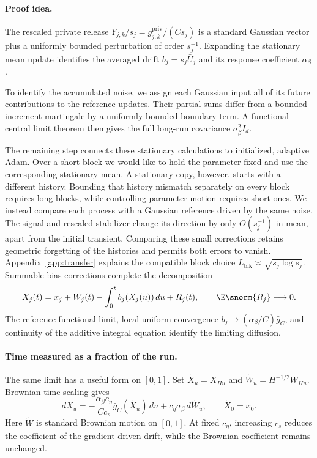 \paragraph{Proof idea.}
The rescaled private release
$Y_{j,k}/s_j=g^{\mathrm{priv}}_{j,k}/(Cs_j)$ is a standard Gaussian
vector plus a uniformly bounded perturbation of order $s_j^{-1}$.
Expanding the stationary mean update identifies the averaged drift
$b_j=s_j\bar U_j$ and its response coefficient $\alpha_\beta$.

To identify the accumulated noise, we assign each Gaussian input all of
its future contributions to the reference updates. Their partial sums
differ from a bounded-increment martingale by a uniformly bounded boundary
term. A functional central limit theorem then gives the full long-run
covariance $\sigma_\beta^2I_d$.

The remaining step connects these stationary calculations to initialized,
adaptive Adam. Over a short block we would like to hold the parameter fixed
and use the corresponding stationary mean. A stationary copy, however,
starts with a different history. Bounding that history mismatch separately
on every block requires long blocks, while controlling parameter motion
requires short ones. We instead compare each process with a Gaussian
reference driven by the same noise. The signal and rescaled stabilizer
change its direction by only $O(s_j^{-1})$ in mean, apart from the initial
transient. Comparing these small corrections retains geometric forgetting
of the histories and permits both errors to vanish. Appendix~\ref{app:transfer}
explains the compatible block choice $L_{\mathrm{blk}}\asymp
\sqrt{s_j\log s_j}$. Summable bias corrections complete the decomposition
\[
 X_j(t)=x_j+W_j(t)-\int_0^t b_j(X_j(u))\,du+R_j(t),
 \qquad \E\snorm{R_j}\longrightarrow0.
\]
The reference functional limit, local uniform convergence
$b_j\to(\alpha_\beta/C)\bar g_C$, and continuity of the additive integral
equation identify the limiting diffusion.

\paragraph{Time measured as a fraction of the run.}
The same limit has a useful form on $[0,1]$. Set $\widetilde X_u=X_{Hu}$
and $\widetilde W_u=H^{-1/2}W_{Hu}$. Brownian time scaling gives
\begin{equation}\label{eq:run-time-sde}
 d\widetilde X_u
 =-\frac{\alpha_\beta c_\eta}{Cc_s}\bar g_C(\widetilde X_u)\,du
       +c_\eta\sigma_\beta\,d\widetilde W_u,
 \qquad \widetilde X_0=x_0.
\end{equation}
Here $\widetilde W$ is standard Brownian motion on $[0,1]$. At fixed
$c_\eta$, increasing $c_s$ reduces the coefficient of the gradient-driven
drift, while the Brownian coefficient remains unchanged.

